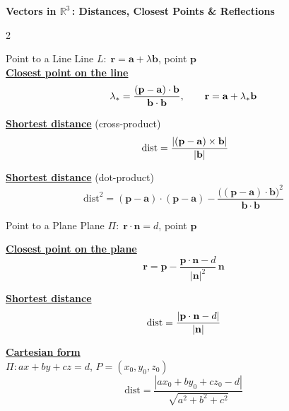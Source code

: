 \documentclass{article}
\newcommand{\Rthree}{\mathbb{R}^3}
\newcommand{\modulus}[1]{\left\lvert #1 \right\rvert}
\newcommand{\length}[1]{\left\lvert #1 \right\rvert}
\begin{document}
\pagestyle{empty}

\setlength{\abovedisplayskip}{5pt}
\setlength{\belowdisplayskip}{5pt}
\setlength{\abovedisplayshortskip}{2pt}
\setlength{\belowdisplayshortskip}{2pt}

\begin{titlebox}
\centering
{\Large\bfseries\sffamily Vectors in \(\Rthree\)\!\,: Distances, Closest Points \& Reflections}
\end{titlebox}

\vspace{1.5mm}

\begin{multicols}{2}
\raggedcolumns
\small

\begin{warmbox}{Point to a Line}
\vspace{2.5pt}
Line $L\!:\;\mathbf r=\mathbf a+\lambda\mathbf b$,\; point $\mathbf p$ \\[2.5pt]

\underline{\textbf{Closest point on the line}}
\[
  \lambda_*=\frac{(\mathbf p-\mathbf a)\cdot\mathbf b}{\mathbf b\cdot\mathbf b},
  \qquad
  \mathbf r=\mathbf a+\lambda_*\mathbf b \\[10pt]
\]

\underline{\textbf{Shortest distance}}\; (cross-product)
\[
  \;\mathrm{dist}
  =\frac{\length{(\mathbf p-\mathbf a)\times\mathbf b}}{\length{\mathbf b}}\; \\[10pt]
\]

\underline{\textbf{Shortest distance}}\; (dot-product)
\[
  \mathrm{dist}^{2}
  =(\mathbf p-\mathbf a)\cdot(\mathbf p-\mathbf a)
   -\frac{\bigl((\mathbf p-\mathbf a)\cdot\mathbf b\bigr)^{2}}
         {\mathbf b\cdot\mathbf b}
\]
\end{warmbox}

\begin{coolbox}{Point to a Plane}
Plane $\Pi\!:\;\mathbf r\cdot\mathbf n=d$,\; point $\mathbf p$

\medskip
\underline{\textbf{Closest point on the plane}}
\[
  \mathbf r
  =\mathbf p
   -\frac{\mathbf p\cdot\mathbf n-d}
         {|\mathbf{n}|^2}\,\mathbf n
\]

\underline{\textbf{Shortest distance}}
\[
  \mathrm{dist}
  =\frac{\modulus{\mathbf p\cdot\mathbf n-d}}{\length{\mathbf n}} \\[10pt]
\]

\underline{\textbf{Cartesian form}}\\
$\Pi\!: ax+by+cz=d$,\; $P=(x_0,y_0,z_0)$
\[
  \mathrm{dist}
  =\frac{\modulus{ax_0+by_0+cz_0-d}}{\sqrt{a^{2}+b^{2}+c^{2}}}
\]
\end{coolbox}


\end{multicols}
\end{document}
